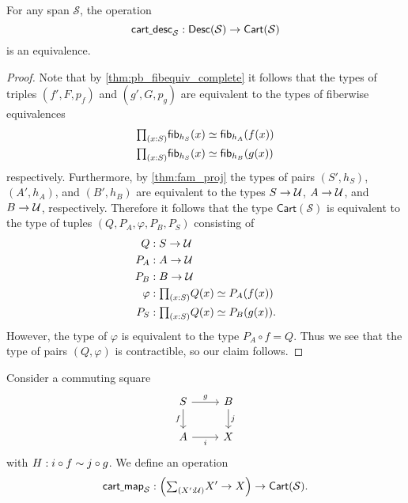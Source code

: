 \begin{lem}\label{lem:cart_desc}
For any span $\mathcal{S}$, the operation
\begin{equation*}
\mathsf{cart\underline{\ }{}desc}_{\mathcal{S}}:\mathsf{Desc}(\mathcal{S})\to \mathsf{Cart}(\mathcal{S})
\end{equation*}
is an equivalence.
\end{lem}

\begin{proof}
Note that by \cref{thm:pb_fibequiv_complete} it follows that the types of triples $(f',F,p_f)$ and $(g',G,p_g)$ are equivalent to the types of fiberwise equivalences
\begin{align*}
& \prd{x:S}\eqv{\fib{h_S}{x}}{\fib{h_A}{f(x)}} \\
& \prd{x:S}\eqv{\fib{h_S}{x}}{\fib{h_B}{g(x)}}
\end{align*} 
respectively. Furthermore, by \cref{thm:fam_proj} the types of pairs $(S',h_S)$, $(A',h_A)$, and $(B',h_B)$ are equivalent to the types $S\to \mathcal{U}$, $A\to \mathcal{U}$, and $B\to \mathcal{U}$, respectively. Therefore it follows that the type $\mathsf{Cart}(\mathcal{S})$ is equivalent to the type of tuples $(Q,P_A,\varphi,P_B,P_S)$ consisting of
\begin{align*}
Q & : S\to \UU \\
P_A & : A \to \UU \\
P_B & : B \to \UU \\
\varphi & : \prd{x:S}\eqv{Q(x)}{P_A(f(x))} \\
P_S & : \prd{x:S}\eqv{Q(x)}{P_B(g(x))}.
\end{align*}
However, the type of $\varphi$ is equivalent to the type $P_A\circ f=Q$. Thus we see that the type of pairs $(Q,\varphi)$ is contractible, so our claim follows.
\end{proof}

\begin{defn}
Consider a commuting square
\begin{equation*}
\begin{tikzcd}
S \arrow[r,"g"] \arrow[d,swap,"f"] & B \arrow[d,"j"] \\
A \arrow[r,swap,"i"] & X
\end{tikzcd}
\end{equation*}
with $H:i\circ f\sim j\circ g$. 
We define an operation
\begin{equation*}
\mathsf{cart\usc{}map}_{\mathcal{S}}:{\Big(\sm{X':\UU}X'\to X\Big)}\to \mathsf{Cart}(\mathcal{S}).
\end{equation*}
\end{defn}

